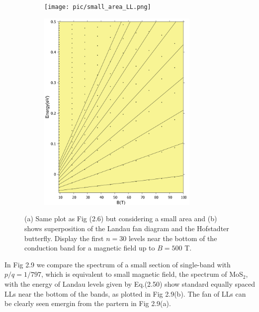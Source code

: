 \documentclass{report}
\begin{document}
\begin{figure}[htb]
	\centering
	\begin{subfigure}[b]{0.49\textwidth}
		\centering
		{\texttt{[image: pic/small\_area\_LL.png]}}
	\end{subfigure}
	\begin{subfigure}[b]{0.49\textwidth}
		\centering
		\includegraphics[width=0.85\textwidth,height=1.2\linewidth]{pic/landaulevel_h0_q_797.pdf}
	\end{subfigure}
	\caption[Exploration Landau levels in Hofstadter butterfly.]{
		(a) Same plot as Fig (2.6) but considering a small area and (b) shows superposition of the Landau fan diagram and the Hofstadter butterfly. Display the first $n = 30$ levels near the bottom of the conduction band for a magnetic field up to $B = 500$ T.
	}
\end{figure}

In Fig 2.9 we compare the spectrum of a small section of single-band with $p / q = 1 / 797$, which is equivalent to small magnetic field, the spectrum of MoS$_{2}$, with the energy of Landau levels given by Eq.(2.50) show standard equally spaced \ac{LLs} \cite{Shoenberg_1984,singleton2001band,blundell2001magnetism,kittel1987quantum} near the bottom of the bands, as plotted in Fig 2.9(b). The fan of \ac{LLs} can be clearly seen emergin from the partern in Fig 2.9(a).
\end{document}
